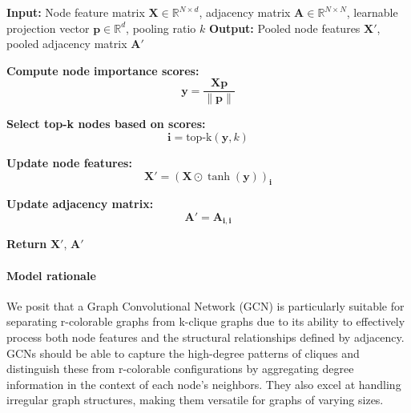 \begin{algorithm}
\caption{Top-K Pooling Algorithm}
\label{alg:topk}
\begin{algorithmic}[1]
    \State \textbf{Input:} Node feature matrix $\mathbf{X} \in \mathbb{R}^{N \times d}$, adjacency matrix $\mathbf{A} \in \mathbb{R}^{N \times N}$, learnable projection vector $\mathbf{p} \in \mathbb{R}^{d}$, pooling ratio $k$
    \State \textbf{Output:} Pooled node features $\mathbf{X'}$, pooled adjacency matrix $\mathbf{A'}$
    \vspace{0.2cm}
    
    \State \textbf{Compute node importance scores:}
    \[
    \mathbf{y} = \frac{\mathbf{X} \mathbf{p}}{\|\mathbf{p}\|}
    \]
    
    \State \textbf{Select top-k nodes based on scores:}
    \[
    \mathbf{i} = \text{top-k}(\mathbf{y}, k)
    \]
    
    \State \textbf{Update node features:}
    \[
    \mathbf{X'} = (\mathbf{X} \odot \tanh(\mathbf{y}))_{\mathbf{i}}
    \]
    
    \State \textbf{Update adjacency matrix:}
    \[
    \mathbf{A'} = \mathbf{A}_{\mathbf{i}, \mathbf{i}}
    \]

    \State \textbf{Return} $\mathbf{X'}$, $\mathbf{A'}$
\end{algorithmic}
\end{algorithm}


\paragraph{Model rationale}
We posit that a Graph Convolutional Network (GCN) is particularly suitable for separating r-colorable graphs from k-clique graphs due to its ability to effectively process both node features and the structural relationships defined by adjacency. GCNs should be able to capture the high-degree patterns of cliques and distinguish these from r-colorable configurations by aggregating degree information in the context of each node’s neighbors. They also excel at handling irregular graph structures, making them versatile for graphs of varying sizes.

